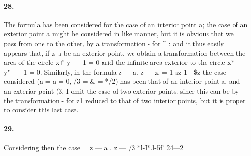 \documentclass[11pt,a4paper]{book}
\begin{document}
{{{{\paragraph{28.} The  formula
has    been    considered    for    the    case    of    an    interior    point    a;    the    case    of   an   exterior
point   a   might   be    considered   in    like    manner,   but    it    is    obvious    that    we    pass   from
one   to   the   other,   by   a    transformation    -      for   ^ ;    and   it   thus    easily   appears   that,   if
z\
a   be   an   exterior   point,    we    obtain    a    transformation    between    the   area    of    the    circle
x\~  +  y\  ---  1  =  0  arid  the  infinite  area  exterior  to  the  circle  x*  +  y"-  ---  1  =  0.
Similarly,  in  the  formula
z  ---  a.    z  ---
z,  =
1-az  1  -  \$z
the   case   considered   (a  =  a  =  0,   /3  =  \&  =  */2)   has   been    that   of    an    interior  point   a,   and
an   exterior   point   (3.      I   omit   the    case   of   two    exterior   points,   since   this   can   be   by
the   transformation  -    for   z1   reduced   to   that   of    two   interior    points,   but   it   is   proper
to  consider  this  last  case.
\paragraph{29.} Considering  then  the  case
\_     z  ---  a  .  z  ---  /3
*l-I*.l-5f'
24---2


}}}}
\end{document}
